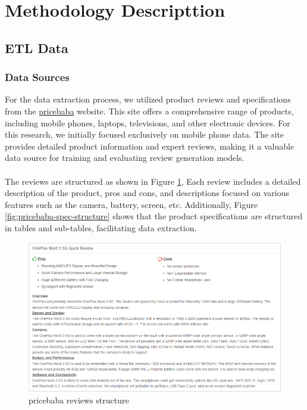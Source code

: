 \section{Methodology Descripttion}
\subsection{ETL Data}
\subsubsection{Data Sources}
For the data extraction process, we utilized product reviews and specifications from the \href{https://pricebaba.com/}{pricebaba} website. This site offers a comprehensive range of products, including mobile phones, laptops, televisions, and other electronic devices. For this research, we initially focused exclusively on mobile phone data. The site provides detailed product information and expert reviews, making it a valuable data source for training and evaluating review generation models.
\\\\
The reviews are structured as shown in Figure \ref{fig:pricebaba-review-structure}, Each review includes a detailed description of the product, pros and cons, and descriptions focused on various features such as the camera, battery, screen, etc. Additionally, Figure \ref{fig:pricebaba-spec-structure} shows that the product specifications are structured in tables and sub-tables, facilitating data extraction.
\begin{figure}[H]
    \centering
    \includegraphics[width=12cm]{images/pricebaba_review_structure.png}
    \caption{pricebaba reviews structure \cite{OnePlusNord35G2023}}
    \label{fig:pricebaba-review-structure}
\end{figure}
